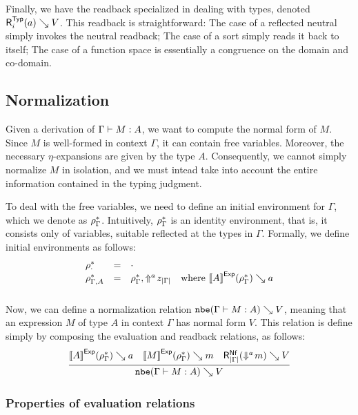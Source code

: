 Finally, we have the readback specialized in dealing with types, denoted $\rbtyp a V$.
This readback is straightforward:
The case of a reflected neutral simply invokes the neutral readback;
The case of a sort simply reads it back to itself;
The case of a function space is essentially a congruence on the domain and co-domain.



\subsection{Normalization}

Given a derivation of $\Gamma \vdash M : A$, we want to compute the normal form of $M$.
Since $M$ is well-formed in context $\Gamma$, it can contain free variables.
Moreover, the necessary $\eta$-expansions are given by the type $A$.
Consequently, we cannot simply normalize $M$ in isolation, and we must intead take into account the entire information contained in the typing judgment.

To deal with the free variables, we need to define an initial environment for $\Gamma$, which we denote as $\rho^*_{\Gamma}$.
Intuitively, $\rho^*_{\Gamma}$ is an identity environment, that is, it consists only of variables, suitable reflected at the types in $\Gamma$.
Formally, we define initial environments as follows:
\[
\begin{array}{lcll}
  \rho^*_{\cdot}          & = & \cdot \\
  \rho^*_{\Gamma, A} & = & \rho^*_{\Gamma}, \Uparrow^{a}\!z_{|\Gamma|} & \text{where } {[\![A]\!]}^{\mathsf{Exp}}(\rho^*_{\Gamma}) \searrow a \\[8pt]
\end{array}
\]

Now, we can define a normalization relation $\texttt{nbe}(\Gamma \vdash M : A) \searrow V$, meaning that an expression $M$ of type $A$ in context $\Gamma$ has normal form $V$.
This relation is define simply by composing the evaluation and readback relations, as follows:
\[
\infer{
  \nbeexp \Gamma M A V
}{
  \evalexp A {\denvinit \Gamma} a
  &
  \evalexp M {\denvinit \Gamma} m
  &
  \rbnf[|\Gamma|] {\dreify a m} V
}
\]




\subsubsection{Properties of evaluation relations}


